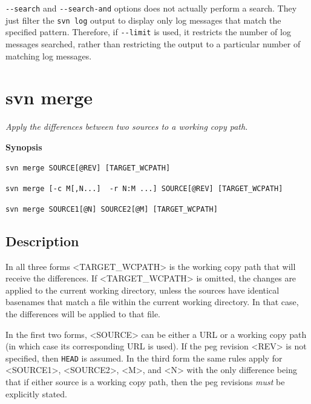 \texttt{-\/-search} and \texttt{-\/-search-and} options does not
actually perform a search. They just filter the \texttt{svn\ log} output
to display only log messages that match the specified pattern.
Therefore, if \texttt{-\/-limit} is used, it restricts the number of log
messages searched, rather than restricting the output to a particular
number of matching log messages.

\section{svn merge}\label{svn.ref.svn.c.merge}

\emph{Apply the differences between two sources to a working copy path.}

\textbf{Synopsis}

\texttt{svn\ merge\ SOURCE{[}@REV{]}\ {[}TARGET\_WCPATH{]}}

\texttt{svn\ merge\ {[}-c\ M{[},N...{]}\ \textbar{}\ -r\ N:M\ ...{]}\ SOURCE{[}@REV{]}\ {[}TARGET\_WCPATH{]}}

\texttt{svn\ merge\ SOURCE1{[}@N{]}\ SOURCE2{[}@M{]}\ {[}TARGET\_WCPATH{]}}

\subsection{Description}

In all three forms \textless TARGET\_WCPATH\textgreater{} is the working
copy path that will receive the differences. If
\textless TARGET\_WCPATH\textgreater{} is omitted, the changes are
applied to the current working directory, unless the sources have
identical basenames that match a file within the current working
directory. In that case, the differences will be applied to that file.

In the first two forms, \textless SOURCE\textgreater{} can be either a
URL or a working copy path (in which case its corresponding URL is
used). If the peg revision \textless REV\textgreater{} is not specified,
then \texttt{HEAD} is assumed. In the third form the same rules apply
for \textless SOURCE1\textgreater, \textless SOURCE2\textgreater,
\textless M\textgreater, and \textless N\textgreater{} with the only
difference being that if either source is a working copy path, then the
peg revisions \emph{must} be explicitly stated.

